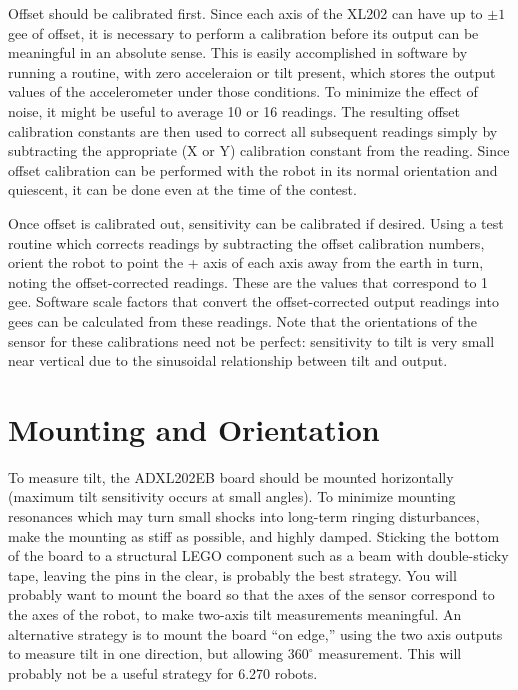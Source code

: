 Offset should be calibrated first.  Since each axis of the XL202 can
have up to $\pm 1$gee of offset, it is necessary to perform a calibration
before its output can be meaningful in an absolute sense.  This is
easily accomplished in software by running a routine, with zero
acceleraion or tilt present, which stores the output values of the
accelerometer under those conditions.  To minimize the effect of
noise, it might be useful to average 10 or 16 readings.  The resulting
offset calibration constants are then used to correct all subsequent
readings simply by subtracting the appropriate (X or Y) calibration
constant from the reading.  Since offset calibration can be performed
with the robot in its normal orientation and quiescent, it can be done
even at the time of the contest. 

Once offset is calibrated out, sensitivity can be calibrated if
desired.  Using a test routine which corrects readings by subtracting
the offset calibration numbers, orient the robot to point the + axis
of each axis away from the earth in turn, noting the offset-corrected
readings.  These are the values that correspond to 1 gee. 
Software scale factors that convert the offset-corrected output
readings into gees can be calculated from these readings.  Note that
the orientations of the sensor for these calibrations need not be
perfect:  sensitivity to tilt is very small near vertical due to the
sinusoidal relationship between tilt and output. 

\section{Mounting and Orientation}

To measure tilt, the ADXL202EB board should be mounted horizontally
(maximum tilt sensitivity occurs at small angles).  To minimize
mounting resonances which may turn small shocks into long-term ringing
disturbances, make the mounting as stiff as possible, and highly
damped.  Sticking the bottom of the board to a structural LEGO
component such as a beam with double-sticky tape, leaving the pins in
the clear, is probably the best strategy.  You will probably want to
mount the board so that the axes of the sensor correspond to the axes
of the robot, to make two-axis tilt measurements meaningful.  An
alternative strategy is to mount the board ``on edge,'' using the two
axis outputs to measure tilt in one direction, but allowing $360^\circ$
measurement.  This will probably not be a useful strategy for 6.270
robots. 

